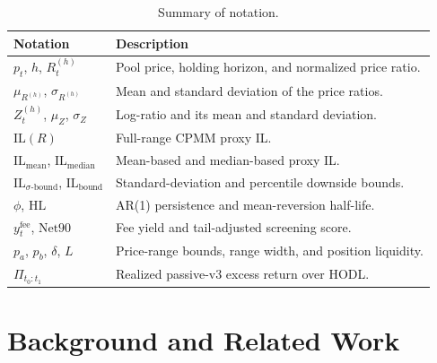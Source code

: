 \documentclass[10pt,conference,compsocconf]{IEEEtran}
\begin{document}
\begin{table}[t]
\centering
\caption{Summary of notation.}
\label{tab:notation}
\scriptsize
\begingroup
\setlength{\tabcolsep}{3pt}
\renewcommand{\arraystretch}{0.92}
\begin{tabular}{@{}p{}p{}@{}}
\toprule
Notation & Description \\
\midrule
$p_t$, $h$, $R_t^{(h)}$
& Pool price, holding horizon, and normalized price ratio. \\

$\mu_{R^{(h)}}$, $\sigma_{R^{(h)}}$
& Mean and standard deviation of the price ratios. \\

$Z_t^{(h)}$, $\mu_Z$, $\sigma_Z$
& Log-ratio and its mean and standard deviation. \\

$\mathrm{IL}(R)$
& Full-range CPMM proxy IL. \\

$\mathrm{IL}_{\mathrm{mean}}$,
$\mathrm{IL}_{\mathrm{median}}$
& Mean-based and median-based proxy IL. \\

$\mathrm{IL}_{\sigma\text{-bound}}$,
$\mathrm{IL}_{\mathrm{bound}}$
& Standard-deviation and percentile downside bounds. \\

$\phi$, $\mathrm{HL}$
& AR(1) persistence and mean-reversion half-life. \\

$y_t^{\mathrm{fee}}$, $\mathrm{Net90}$
& Fee yield and tail-adjusted screening score. \\

$p_a$, $p_b$, $\delta$, $L$
& Price-range bounds, range width, and position liquidity. \\

$\Pi_{t_0:t_1}$
& Realized passive-v3 excess return over HODL. \\

\bottomrule
\end{tabular}
\endgroup
\end{table}

\section{Background and Related Work}
\label{sec:background}
\end{document}

